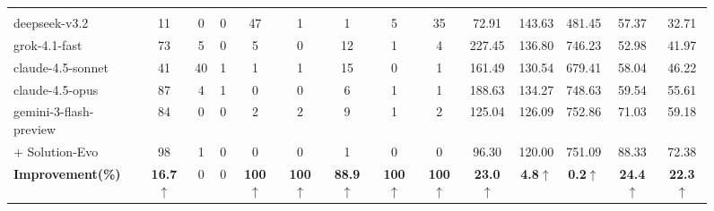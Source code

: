\documentclass{article}
\theoremstyle{plain}
\theoremstyle{definition}
\theoremstyle{remark}
\begin{document}
\begin{figure}[t]
\begin{minipage}[t]{\textwidth}
\begin{tabular}{l cccccccc ccc c >{\columncolor{cyan!15}}c}
\midrule
\rowcolor{gray!15} \multicolumn{14}{c}{\textit{\textbf{Java}}} \\
deepseek-v3.2 & \cellcolor{cyan!15}11 & 0 & 0 & 47 & 1 & 1 & 5 & 35 & \cellcolor{cyan!15}72.91 & 143.63 & 481.45 & \cellcolor{cyan!15}57.37 & 32.71 \\
grok-4.1-fast & \cellcolor{cyan!15}73 & 5 & 0 & 5 & 0 & 12 & 1 & 4 & \cellcolor{cyan!15}227.45 & 136.80 & 746.23 & \cellcolor{cyan!15}52.98 & 41.97 \\
claude-4.5-sonnet & \cellcolor{cyan!15}41 & 40 & 1 & 1 & 1 & 15 & 0 & 1 & \cellcolor{cyan!15}161.49 & 130.54 & 679.41 & \cellcolor{cyan!15}58.04 & 46.22 \\
claude-4.5-opus & \cellcolor{cyan!15}87 & 4 & 1 & 0 & 0 & 6 & 1 & 1 & \cellcolor{cyan!15}188.63 & 134.27 & 748.63 & \cellcolor{cyan!15}59.54 & 55.61 \\
gemini-3-flash-preview & \cellcolor{cyan!15}84 & 0 & 0 & 2 & 2 & 9 & 1 & 2 & \cellcolor{cyan!15}125.04 & 126.09 & 752.86 & \cellcolor{cyan!15}71.03 & 59.18 \\
\quad + Solution-Evo & \cellcolor{cyan!15}98 & 1 & 0 & 0 & 0 & 1 & 0 & 0 & \cellcolor{cyan!15}96.30 & 120.00 & 751.09 & \cellcolor{cyan!15}88.33 & 72.38 \\
\cmidrule{2-14}
\textbf{Improvement(\%)} & \cellcolor{cyan!15}\textbf{16.7$\uparrow$} & 0 & 0 & \textbf{100$\uparrow$} & \textbf{100$\uparrow$} & \textbf{88.9$\uparrow$} & \textbf{100$\uparrow$} & \textbf{100$\uparrow$} & \cellcolor{cyan!15}\textbf{23.0$\uparrow$} & \textbf{4.8$\uparrow$} & \textbf{0.2$\uparrow$} & \cellcolor{cyan!15}\textbf{24.4$\uparrow$} & \textbf{22.3$\uparrow$} \\


\end{tabular}
\end{minipage}
\end{figure}
\end{document}
